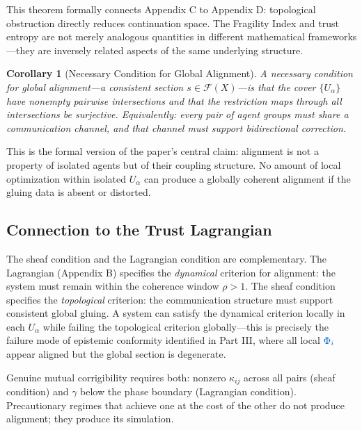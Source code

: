 \documentclass[11pt,a4paper]{article}
\newcommand{\scalar}[1]{\textcolor{scalarcolor}{\ensuremath{#1}}}
\theoremstyle{definition}
\theoremstyle{plain}
\newtheorem{corollary}[theorem]{Corollary}
\begin{document}
\begin{mdframed}[style=appendixbox]
This theorem formally connects Appendix C to Appendix D: topological obstruction directly reduces continuation space. The Fragility Index and trust entropy are not merely analogous quantities in different mathematical frameworks---they are inversely related aspects of the same underlying structure.

\begin{corollary}[Necessary Condition for Global Alignment]
A necessary condition for global alignment---a consistent section $s \in \mathcal{F}(X)$---is that the cover $\{U_\alpha\}$ have nonempty pairwise intersections and that the restriction maps through all intersections be surjective. Equivalently: every pair of agent groups must share a communication channel, and that channel must support bidirectional correction.
\end{corollary}

This is the formal version of the paper's central claim: alignment is not a property of isolated agents but of their coupling structure. No amount of local optimization within isolated $U_\alpha$ can produce a globally coherent alignment if the gluing data is absent or distorted.

\subsection{Connection to the Trust Lagrangian}

The sheaf condition and the Lagrangian condition are complementary. The Lagrangian (Appendix B) specifies the \emph{dynamical} criterion for alignment: the system must remain within the coherence window $\rho > 1$. The sheaf condition specifies the \emph{topological} criterion: the communication structure must support consistent global gluing. A system can satisfy the dynamical criterion locally in each $U_\alpha$ while failing the topological criterion globally---this is precisely the failure mode of epistemic conformity identified in Part III, where all local $\scalar{\Phi_i}$ appear aligned but the global section is degenerate.

Genuine mutual corrigibility requires both: nonzero $\kappa_{ij}$ across all pairs (sheaf condition) and $\gamma$ below the phase boundary (Lagrangian condition). Precautionary regimes that achieve one at the cost of the other do not produce alignment; they produce its simulation.

\end{mdframed}

\end{document}
